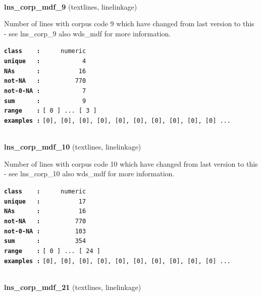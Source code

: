 \documentclass[]{article}
\begin{document}
~

\textbf{lns\_corp\_mdf\_9} (textlines, linelinkage)

Number of lines with corpus code 9 which have changed from last version
to this - see lns\_corp\_9 also wds\_mdf for more information.

\textbf{\texttt{class\ \ \ \ :}} \texttt{~~~~~numeric}\\
\textbf{\texttt{unique\ \ \ :}} \texttt{~~~~~~~~~~~4}\\
\textbf{\texttt{NAs\ \ \ \ \ \ :}} \texttt{~~~~~~~~~~16}\\
\textbf{\texttt{not-NA\ \ \ :}} \texttt{~~~~~~~~~770}\\
\textbf{\texttt{not-0-NA\ :}} \texttt{~~~~~~~~~~~7}\\
\textbf{\texttt{sum\ \ \ \ \ \ :}} \texttt{~~~~~~~~~~~9}\\
\textbf{\texttt{range\ \ \ \ :}}
\texttt{{[}\ 0\ {]}\ ...\ {[}\ 3\ {]}}\\
\textbf{\texttt{examples\ :}}
\texttt{{[}0{]},\ {[}0{]},\ {[}0{]},\ {[}0{]},\ {[}0{]},\ {[}0{]},\ {[}0{]},\ {[}0{]},\ {[}0{]},\ {[}0{]}\ ...}\\

~

\textbf{lns\_corp\_mdf\_10} (textlines, linelinkage)

Number of lines with corpus code 10 which have changed from last version
to this - see lns\_corp\_10 also wds\_mdf for more information.

\textbf{\texttt{class\ \ \ \ :}} \texttt{~~~~~numeric}\\
\textbf{\texttt{unique\ \ \ :}} \texttt{~~~~~~~~~~17}\\
\textbf{\texttt{NAs\ \ \ \ \ \ :}} \texttt{~~~~~~~~~~16}\\
\textbf{\texttt{not-NA\ \ \ :}} \texttt{~~~~~~~~~770}\\
\textbf{\texttt{not-0-NA\ :}} \texttt{~~~~~~~~~103}\\
\textbf{\texttt{sum\ \ \ \ \ \ :}} \texttt{~~~~~~~~~354}\\
\textbf{\texttt{range\ \ \ \ :}}
\texttt{{[}\ 0\ {]}\ ...\ {[}\ 24\ {]}}\\
\textbf{\texttt{examples\ :}}
\texttt{{[}0{]},\ {[}0{]},\ {[}0{]},\ {[}0{]},\ {[}0{]},\ {[}0{]},\ {[}0{]},\ {[}0{]},\ {[}0{]},\ {[}0{]}\ ...}\\

~

\textbf{lns\_corp\_mdf\_21} (textlines, linelinkage)
\end{document}
